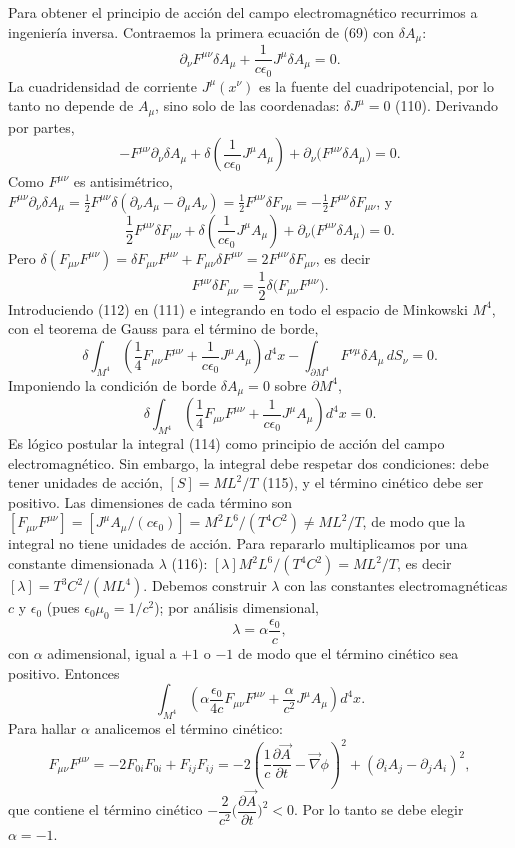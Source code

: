 Para obtener el principio de acción del campo electromagnético recurrimos
a ingeniería inversa. Contraemos la primera ecuación de (69) con
$\delta A_\mu$:
\[
\partial_\nu F^{\mu\nu}\delta A_\mu+\frac{1}{c\epsilon_0}J^\mu\delta
A_\mu=0. \tag{109}
\]
La cuadridensidad de corriente $J^\mu(x^\nu)$ es la fuente del
cuadripotencial, por lo tanto no depende de $A_\mu$, sino solo de las
coordenadas: $\delta J^\mu=0$ (110). Derivando por partes,
\[
-F^{\mu\nu}\partial_\nu\delta A_\mu+\delta\left(\frac{1}{c\epsilon_0}
J^\mu A_\mu\right)+\partial_\nu\big(F^{\mu\nu}\delta A_\mu\big)=0.
\]
Como $F^{\mu\nu}$ es antisimétrico, $F^{\mu\nu}\partial_\nu\delta A_\mu=
\frac12F^{\mu\nu}\delta(\partial_\nu A_\mu-\partial_\mu A_\nu)=
\frac12F^{\mu\nu}\delta F_{\nu\mu}=-\frac12F^{\mu\nu}\delta F_{\mu\nu}$, y
\[
\frac12F^{\mu\nu}\delta F_{\mu\nu}+\delta\left(\frac{1}{c\epsilon_0}
J^\mu A_\mu\right)+\partial_\nu\big(F^{\mu\nu}\delta A_\mu\big)=0.
\tag{111}
\]
Pero $\delta(F_{\mu\nu}F^{\mu\nu})=\delta F_{\mu\nu}F^{\mu\nu}+F_{\mu\nu}
\delta F^{\mu\nu}=2F^{\mu\nu}\delta F_{\mu\nu}$, es decir
\[
F^{\mu\nu}\delta F_{\mu\nu}=\frac12\delta\big(F_{\mu\nu}F^{\mu\nu}\big).
\tag{112}
\]
Introduciendo (112) en (111) e integrando en todo el espacio de
Minkowski $M^4$, con el teorema de Gauss para el término de borde,
\[
\delta\int_{M^4}\left(\frac14F_{\mu\nu}F^{\mu\nu}+\frac{1}{c\epsilon_0}
J^\mu A_\mu\right)d^4x-\int_{\partial M^4}F^{\nu\mu}\delta A_\mu\,dS_\nu
=0.
\]
Imponiendo la condición de borde $\delta A_\mu=0$ sobre $\partial M^4$,
\[
\delta\int_{M^4}\left(\frac14F_{\mu\nu}F^{\mu\nu}+\frac{1}{c\epsilon_0}
J^\mu A_\mu\right)d^4x=0. \tag{113}
\]
Es lógico postular la integral (114) como principio de acción del campo
electromagnético. Sin embargo, la integral debe respetar dos condiciones:
debe tener unidades de acción, $[S]=ML^2/T$ (115), y el término cinético
debe ser positivo. Las dimensiones de cada término son
$[F_{\mu\nu}F^{\mu\nu}]=[J^\mu A_\mu/(c\epsilon_0)]=M^2L^6/(T^4C^2)\neq
ML^2/T$, de modo que la integral no tiene unidades de acción. Para
repararlo multiplicamos por una constante dimensionada $\lambda$ (116):
$[\lambda]M^2L^6/(T^4C^2)=ML^2/T$, es decir
$[\lambda]=T^3C^2/(ML^4)$. Debemos construir $\lambda$ con las
constantes electromagnéticas $c$ y $\epsilon_0$ (pues
$\epsilon_0\mu_0=1/c^2$); por análisis dimensional,
\[
\lambda=\alpha\frac{\epsilon_0}{c}, \tag{117}
\]
con $\alpha$ adimensional, igual a $+1$ o $-1$ de modo que el término
cinético sea positivo. Entonces
\[
\int_{M^4}\left(\alpha\frac{\epsilon_0}{4c}F_{\mu\nu}F^{\mu\nu}+
\frac{\alpha}{c^2}J^\mu A_\mu\right)d^4x. \tag{118}
\]
Para hallar $\alpha$ analicemos el término cinético:
\[
F_{\mu\nu}F^{\mu\nu}=-2F_{0i}F_{0i}+F_{ij}F_{ij}=-2\left(\frac1c
\frac{\partial\vec A}{\partial t}-\vec\nabla\phi\right)^2+(\partial_iA_j-
\partial_jA_i)^2,
\]
que contiene el término cinético $-\dfrac{2}{c^2}\Big(\dfrac{\partial\vec
A}{\partial t}\Big)^2<0$. Por lo tanto se debe elegir $\alpha=-1$.

